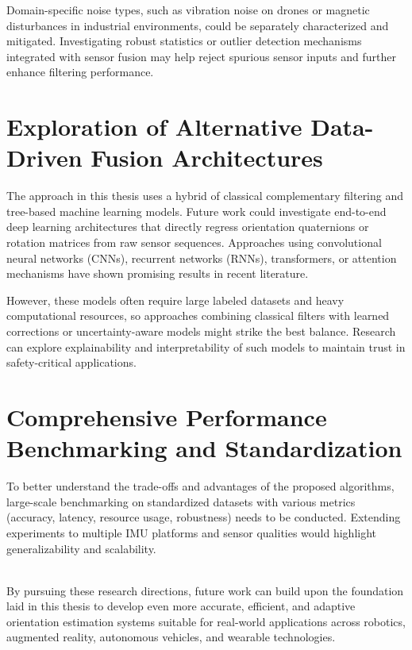 \documentclass{iutbscthesis}
\begin{document}
Domain-specific noise types, such as vibration noise on drones or magnetic disturbances in industrial environments, could be separately characterized and mitigated. Investigating robust statistics or outlier detection mechanisms integrated with sensor fusion may help reject spurious sensor inputs and further enhance filtering performance.

\section{Exploration of Alternative Data-Driven Fusion Architectures}
The approach in this thesis uses a hybrid of classical complementary filtering and tree-based machine learning models. Future work could investigate end-to-end deep learning architectures that directly regress orientation quaternions or rotation matrices from raw sensor sequences. Approaches using convolutional neural networks (CNNs), recurrent networks (RNNs), transformers, or attention mechanisms have shown promising results in recent literature.

However, these models often require large labeled datasets and heavy computational resources, so approaches combining classical filters with learned corrections or uncertainty-aware models might strike the best balance. Research can explore explainability and interpretability of such models to maintain trust in safety-critical applications.

\section{Comprehensive Performance Benchmarking and Standardization}
To better understand the trade-offs and advantages of the proposed algorithms, large-scale benchmarking on standardized datasets with various metrics (accuracy, latency, resource usage, robustness) needs to be conducted. Extending experiments to multiple IMU platforms and sensor qualities would highlight generalizability and scalability.

\\
By pursuing these research directions, future work can build upon the foundation laid in this thesis to develop even more accurate, efficient, and adaptive orientation estimation systems suitable for real-world applications across robotics, augmented reality, autonomous vehicles, and wearable technologies.
\end{document}
